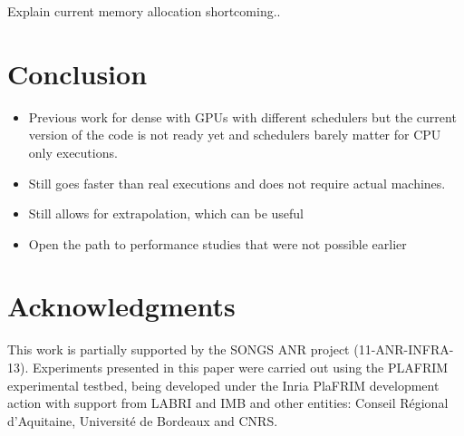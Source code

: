 \documentclass[smallextended]{svjour3}
\begin{document}
Explain current memory allocation shortcoming..

\section{Conclusion}
\label{sec-5}
\begin{itemize}
\item Previous work for dense with GPUs with different schedulers but the
current version of the code is not ready yet and schedulers barely
matter for CPU only executions.
\item Still goes faster than real executions and does not require actual
machines.
\item Still allows for extrapolation, which can be useful
\item Open the path to performance studies that were not possible earlier
\end{itemize}

\section*{Acknowledgments}
This work is partially supported by the SONGS ANR project
(11-ANR-INFRA-13). Experiments presented in this paper were carried
out using the PLAFRIM experimental testbed, being developed under the
Inria PlaFRIM development action with support from LABRI and IMB and
other entities: Conseil Régional d'Aquitaine, Université de Bordeaux
and CNRS.

\def\raggedright{}


\end{document}
